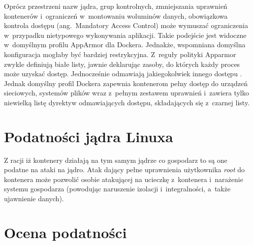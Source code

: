 Oprócz przestrzeni nazw jądra, grup kontrolnych, zmniejszania uprawnień kontenerów i~ograniczeń w~montowaniu woluminów danych, obowiązkowa kontrola dostępu (ang.~Mandatory Access Control) może wymuszać ograniczenia w~przypadku nietypowego wykonywania aplikacji. Takie podejście jest widoczne w~domyślnym profilu AppArmor dla Dockera. Jednakże, wspomniana domyślna konfiguracja mogłaby być bardziej restrykcyjna. Z~reguły polityki Apparmor zwykle definiują białe listy, jawnie deklarując zasoby, do których każdy proces może uzyskać dostęp. Jednocześnie odmawiają jakiegokolwiek innego dostępu \cite{ChoiTrustworthyDesignArchitecture}. Jednak domyślny profil Dockera zapewnia kontenerom pełny dostęp do urządzeń sieciowych, systemów plików wraz z~pełnym zestawem uprawnień i~zawiera tylko niewielką listę dyrektyw odmawiających dostępu, składających się z~czarnej listy.

\section{Podatności jądra Linuxa}

Z racji iż kontenery działają na tym samym jądrze co gospodarz to są one podatne na ataki na jądro. Atak dający pełne uprawnienia użytkownika \textit{root} do kontenera może pozwolić osobie atakującej na ucieczkę z~kontenera i~narażenie systemu gospodarza (powodując naruszenie izolacji i~integralności, a~także ujawnienie danych).

\section{Ocena podatności}

